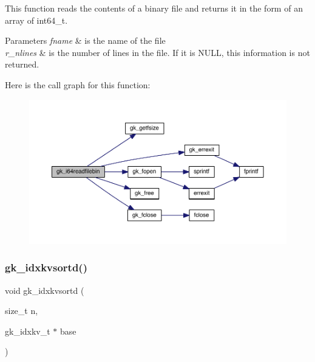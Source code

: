 This function reads the contents of a binary file and returns it in the form of an array of int64\+\_\+t. 
\begin{DoxyParams}{Parameters}
{\em fname} & is the name of the file \\
\hline
{\em r\+\_\+nlines} & is the number of lines in the file. If it is N\+U\+LL, this information is not returned. \\
\hline
\end{DoxyParams}
Here is the call graph for this function\+:\nopagebreak
\begin{figure}[H]
\begin{center}
\leavevmode
\includegraphics[width=350pt]{a00077_aca460764497638a612f886a089662416_cgraph}
\end{center}
\end{figure}
\mbox{\label{a00077_a53690cb705b8749f83a8ae609e94aafd}} 
\subsubsection{\texorpdfstring{gk\+\_\+idxkvsortd()}{gk\_idxkvsortd()}}
{\footnotesize\ttfamily void gk\+\_\+idxkvsortd (\begin{DoxyParamCaption}\item[{size\+\_\+t}]{n,  }\item[{gk\+\_\+idxkv\+\_\+t $\ast$}]{base }\end{DoxyParamCaption})}

